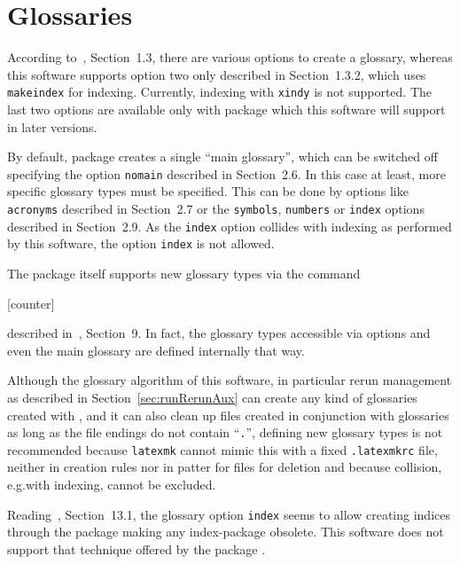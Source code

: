 \section{Glossaries}\label{sec:gapGlossaries}

According to~\cite{GloP4_54}, Section~1.3, 
there are various options to create a glossary, 
whereas this software supports option two only described in Section~1.3.2, 
which uses \texttt{makeindex} for indexing. 
Currently, indexing with \texttt{xindy} is not supported. 
The last two options are available only with package  
which this software will support in later versions. 

By default, package  creates a single ``main glossary'', 
which can be switched off specifying the option \texttt{nomain} 
described in Section~2.6. 
In this case at least, more specific glossary types must be specified. 
This can be done by options like \texttt{acronyms} described in Section~2.7 
or the \texttt{symbols},
\texttt{numbers} or \texttt{index} options described in Section~2.9. 
As the \texttt{index} option collides with indexing as performed by this software, 
the option \texttt{index} is not allowed. 

The package  itself 
supports new glossary types via the command
%
\begin{taglstlisting}[language=TeX, basicstyle=\small]
[counter]
\end{taglstlisting}
%
described in~\cite{GloP4_54}, Section~9. 
In fact, the glossary types accessible via options and even the main glossary 
are defined internally that way. 

Although the glossary algorithm of this software, 
in particular rerun management as described in Section~\ref{sec:runRerunAux}
can create any kind of glossaries created with , 
and it can also clean up files created in conjunction with glossaries 
as long as the file endings do not contain ``\texttt{.}'',
defining new glossary types is not recommended 
because \texttt{latexmk} cannot mimic this 
with a fixed \texttt{.latexmkrc} file, neither in creation rules 
nor in patter for files for deletion  
and because collision, e.g.\@ with indexing, cannot be excluded. 

Reading~\cite{GloP4_54}, Section~13.1, the glossary option \texttt{index} 
seems to allow creating indices through the  package 
making any index-package obsolete. 
This software does not support that technique offered by the package . 

